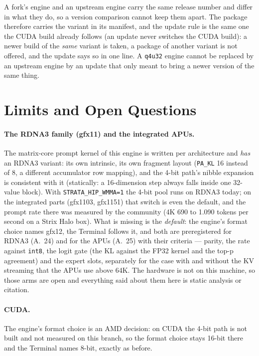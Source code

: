 \documentclass[10pt,twocolumn]{article}
\begin{document}
A fork's engine and an upstream engine carry the same release number and differ in what they do, so a
version comparison cannot keep them apart. The package therefore carries the variant in its manifest, and
the update rule is the same one the CUDA build already follows (an update never switches the CUDA build):
a newer build of the \emph{same} variant is taken, a package of another variant is not offered, and the
update says so in one line. A \texttt{q4u32} engine cannot be replaced by an upstream engine by an update
that only meant to bring a newer version of the same thing.

\section{Limits and Open Questions}
\label{sec:limits}

\paragraph{The RDNA3 family (gfx11) and the integrated APUs.} The matrix-core prompt kernel of this engine
is written per architecture and \emph{has} an RDNA3 variant: its own intrinsic, its own fragment layout
(\texttt{PA\_KL} 16 instead of 8, a different accumulator row mapping), and the 4-bit path's nibble
expansion is consistent with it (statically: a 16-dimension step always falls inside one 32-value block).
With \texttt{STRATA\_HIP\_WMMA=1} the 4-bit pool runs on RDNA3 today; on the integrated parts (gfx1103,
gfx1151) that switch is even the default, and the prompt rate there was measured by the community
(4K 690 to 1.090 tokens per second on a Strix Halo box). What is missing is the \emph{default}: the
engine's format choice names gfx12, the Terminal follows it, and both are preregistered for RDNA3
(A.~24) and for the APUs (A.~25) with their criteria --- parity, the rate against \texttt{int8}, the
logit gate (the KL against the FP32 kernel and the top-p agreement) and the expert slots, separately for
the case with and without the KV streaming that the APUs use above 64K. The hardware is not on this
machine, so those arms are open and everything said about them here is static analysis or citation.

\paragraph{CUDA.} The engine's format choice is an AMD decision: on CUDA the 4-bit path is not built and
not measured on this branch, so the format choice stays 16-bit there and the Terminal names 8-bit, exactly
as before.
\end{document}
